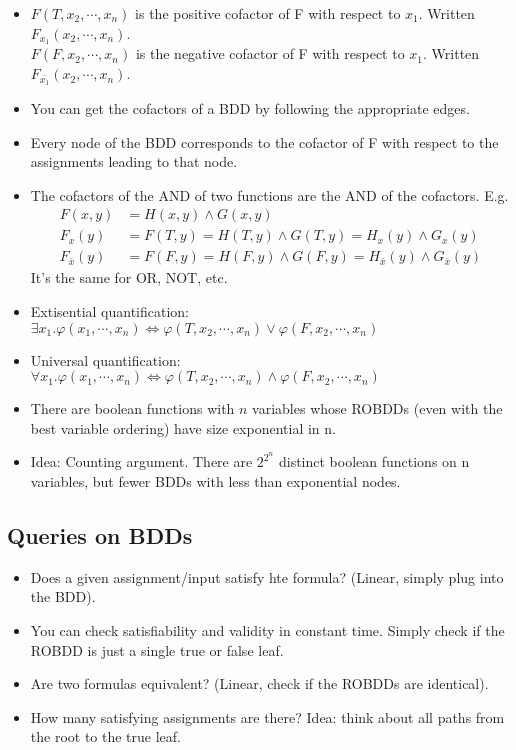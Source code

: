 \documentclass{article}
\begin{document}
\begin{itemize}
    \item $F(T, x_2,\cdots, x_n)$ is the positive cofactor of F with respect to $x_1$. Written $F_{x_1}(x_2, \cdots, x_n)$. \\$F(F, x_2, \cdots, x_n)$ is the negative cofactor of F with respect to $x_1$. Written $F_{\bar{x_1}}(x_2, \cdots, x_n)$.
    \item You can get the cofactors of a BDD by following the appropriate edges.
    \item Every node of the BDD corresponds to the cofactor of F with respect to the assignments leading to that node.
    \item The cofactors of the AND of two functions are the AND of the cofactors. E.g. \begin{align*}
    F(x, y) &= H(x, y) \land G(x, y) \\
    F_x(y) &= F(T, y) = H(T, y) \land G(T, y) = H_x(y) \land G_x(y) \\
    F_{\bar{x}}(y) &= F(F, y) = H(F, y) \land G(F, y) = H_{\bar{x}}(y) \land G_{\bar{x}}(y)
    \end{align*}
    It's the same for OR, NOT, etc.
    \item Extisential quantification: $\exists x_1.\varphi(x_1, \cdots, x_n) \iff \varphi(T, x_2, \cdots, x_n) \lor \varphi(F, x_2, \cdots, x_n)$
    \item Universal quantification: $\forall x_1.\varphi(x_1, \cdots, x_n) \iff \varphi(T, x_2, \cdots, x_n) \land \varphi(F, x_2, \cdots, x_n)$
    \item There are boolean functions with $n$ variables whose ROBDDs (even with the best variable ordering) have size exponential in n.
    \item Idea: Counting argument. There are $2^{2^n}$ distinct boolean functions on n variables, but fewer BDDs with less than exponential nodes.
\end{itemize}
\subsection*{Queries on BDDs}
\begin{itemize}
\item Does a given assignment/input satisfy hte formula? (Linear, simply plug into the BDD).
\item You can check satisfiability and validity in constant time. Simply check if the ROBDD is just a single true or false leaf.
\item Are two formulas equivalent? (Linear, check if the ROBDDs are identical).
\item How many satisfying assignments are there? Idea: think about all paths from the root to the true leaf.
\end{itemize}
\end{document}
